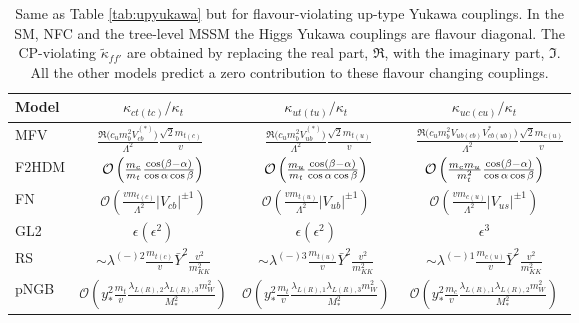 \documentclass[../report.tex]{subfiles}
\begin{document}
\begin{table}[t]
\begin{center}
\begin{tabular}{l  c  c  c }
\toprule[0.1em]
Model	& $\kappa_{ct (tc)}/\kappa_t$ & $\kappa_{ut (tu)}/\kappa_t$  & $\kappa_{uc (cu)}/\kappa_t$ \\ \midrule[0.05em]\vspace{0.15cm}
MFV &$ \frac{\Re\big( c_u m_b^2 V_{cb}^{(*)}\big)}{\Lambda^2}\frac{\sqrt2 m_{t(c)}}{v} $~&~ $ \frac{\Re\big( c_u m_b^2 V_{ub}^{(*)}\big)}{\Lambda^2} \frac{\sqrt2 m_{t(u)}}{v}$~&~ $ \frac{\Re\big( c_u m_b^2 V_{ub(cb)}V_{cb(ub)}^{*}\big)}{\Lambda^2} \frac{\sqrt2 m_{c(u)}}{v}$\\\vspace{0.15cm}
F2HDM & $\mathcal{O}\left(\frac{m_c}{m_t}\frac{\cos(\beta-\alpha)}{\cos\alpha\cos\beta}\right)$ & $\mathcal{O}\left(\frac{m_u}{m_t}\frac{\cos(\beta-\alpha)}{\cos\alpha\cos\beta}\right)$ & $\mathcal{O}\left(\frac{m_c m_u}{m_t^2}\frac{\cos(\beta-\alpha)}{\cos\alpha\cos\beta}\right)$ \\\vspace{0.15cm}
FN &  $\mathcal{O}\left(\frac{v m_{t(c)}}{\Lambda^2} |V_{cb}|^{\pm 1}\right)$ &
	$\mathcal{O}\left(\frac{v m_{t(u)}}{\Lambda^2} |V_{ub}|^{\pm 1}\right)$ &
	$\mathcal{O}\left(\frac{v m_{c(u)}}{\Lambda^2} |V_{us}|^{\pm 1}\right)$\\\vspace{0.15cm}
GL2	& $\epsilon (\epsilon^2)$ & $\epsilon (\epsilon^2)$ & $\epsilon^3$ \\\vspace{0.15cm}
RS & $\sim \lambda^{(-)2} \frac{m_{t(c)}}{v} \bar Y^2\frac{v^2}{m_{KK}^2} $&$\sim \lambda^{(-)3} \frac{m_{t(u)}}{v} \bar Y^2\frac{v^2}{m_{KK}^2} $&$\sim \lambda^{(-)1} \frac{m_{c(u)}}{v} \bar Y^2\frac{v^2}{m_{KK}^2} $ \\\vspace{0.15cm}
pNGB & ${\mathcal O}(y_*^2 \frac{m_t}{v}\frac{\lambda_{L (R),2} \lambda_{L(R),3}m_W^2}{M_*^2})$ & ${\mathcal O}(y_*^2 \frac{m_t}{v}\frac{\lambda_{L (R),1} \lambda_{L(R),3}m_W^2}{M_*^2})$  & ${\mathcal O}(y_*^2 \frac{m_c}{v}\frac{\lambda_{L (R),1} \lambda_{L(R),2}m_W^2}{M_*^2})$ \\
\bottomrule[0.1em]
\end{tabular}
\caption{Same as Table \ref{tab:upyukawa} but for flavour-violating up-type Yukawa couplings. In the SM,
  NFC and the tree-level MSSM the Higgs Yukawa couplings are flavour
  diagonal. The CP-violating $\tilde \kappa_{ff'}$ are obtained by replacing the real part, ${\Re}$, with the imaginary part, ${\Im}$. All the other models predict a zero contribution to these flavour changing couplings.
}
\label{tab:upFVyukawa}
\end{center}
\end{table}
\end{document}

